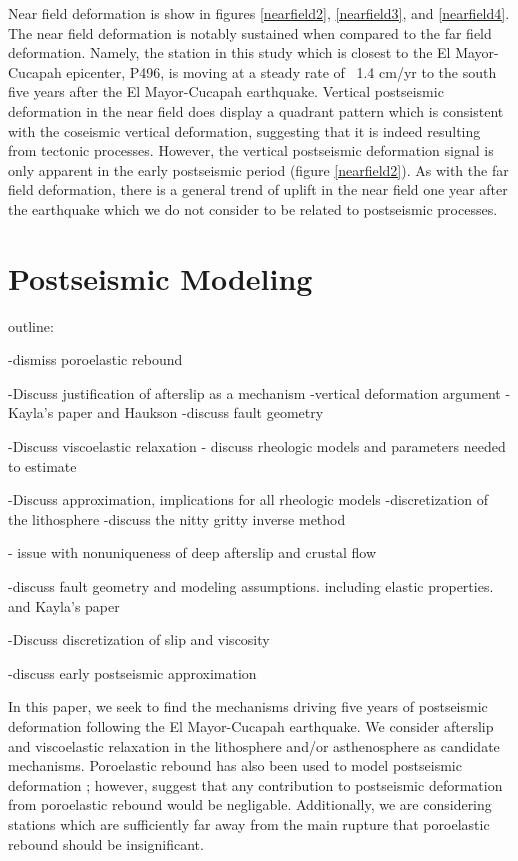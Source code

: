 \documentclass[12pt]{article}
\begin{document}
Near field deformation is show in figures \ref{nearfield2}, \ref{nearfield3}, and \ref{nearfield4}.  The near field deformation is notably sustained when compared to the far field deformation.  Namely, the station in this study which is closest to the El Mayor-Cucapah epicenter, P496, is moving at a steady rate of ~1.4 cm/yr to the south five years after the El Mayor-Cucapah earthquake.  Vertical postseismic deformation in the near field does display a quadrant pattern which is consistent with the coseismic vertical deformation, suggesting that it is indeed resulting from tectonic processes.  However, the vertical postseismic deformation signal is only apparent in the early postseismic period (figure \ref{nearfield2}).  As with the far field deformation, there is a general trend of uplift in the near field one year after the earthquake which we do not consider to be related to postseismic processes.  

\section*{Postseismic Modeling}

outline:

-dismiss poroelastic rebound

-Discuss justification of afterslip as a mechanism
 -vertical deformation argument
 -Kayla's paper and Haukson
 -discuss fault geometry
 
-Discuss viscoelastic relaxation
  - discuss rheologic models and parameters needed to estimate

-Discuss approximation, implications for all rheologic models
-discretization of the lithosphere
-discuss the nitty gritty inverse method

- issue with nonuniqueness of deep afterslip and crustal flow

-discuss fault geometry and modeling assumptions. including elastic properties. and Kayla's paper

-Discuss discretization of slip and viscosity

-discuss early postseismic approximation

In this paper, we seek to find the mechanisms driving five years of postseismic deformation following the El Mayor-Cucapah earthquake. We consider afterslip and viscoelastic relaxation in the lithosphere and/or asthenosphere as candidate mechanisms.  Poroelastic rebound has also been used to model postseismic deformation \cite{Jonsson2003}; however, \cite{Gonzalez-ortega2014} suggest that any contribution to postseismic deformation from poroelastic rebound would be negligable.  Additionally, we are considering stations which are sufficiently far away from the main rupture that poroelastic rebound should be insignificant.  
\end{document}
